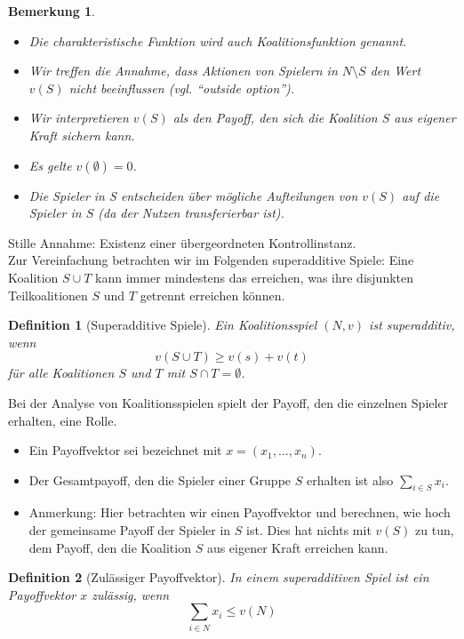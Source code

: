 \documentclass[12pt]{extreport} %
\theoremstyle{named}
\theoremstyle{itshape}
\newtheorem*{definition}{Definition}
\theoremstyle{normal}
\newtheorem*{bemerkung}{Bemerkung}
\begin{document}
\begin{bemerkung} ~\
  \begin{itemize}
	\item Die charakteristische Funktion wird auch Koalitionsfunktion genannt.
	\item Wir treffen die Annahme, dass Aktionen von Spielern in $N \setminus S$ den Wert $v(S)$ nicht beeinflussen (vgl. \enquote{outside option}).
	\item Wir interpretieren $v(S)$ als den Payoff, den sich die Koalition $S$ aus eigener Kraft sichern kann.
	\item Es gelte $v(\emptyset) = 0$.
	\item Die Spieler in S entscheiden über mögliche Aufteilungen von $v(S)$ auf die Spieler in $S$ (da der Nutzen transferierbar ist).	
  \end{itemize}	
\end{bemerkung}

Stille Annahme: Existenz einer übergeordneten Kontrollinstanz.~\\

Zur Vereinfachung betrachten wir im Folgenden superadditive Spiele: Eine Koalition $S \cup T$ kann immer mindestens das erreichen, was ihre disjunkten Teilkoalitionen $S$ und $T$ getrennt erreichen können.

\begin{definition}[Superadditive Spiele]
	Ein Koalitionsspiel $(N, v)$ ist superadditiv, wenn
	$$ v(S \cup T) \geq v(s) + v(t) $$
	für alle Koalitionen $S$ und $T$ mit $S \cap T = \emptyset$.
\end{definition}
	
Bei der Analyse von Koalitionsspielen spielt der Payoff, den die einzelnen Spieler erhalten, eine Rolle.
\begin{itemize}
	\item Ein Payoffvektor sei bezeichnet mit $x = (x_1, \dotsc, x_n)$.
	\item Der Gesamtpayoff, den die Spieler einer Gruppe $S$ erhalten ist also $\sum_{i \in S} x_i$.
	\item Anmerkung: Hier betrachten wir einen Payoffvektor und berechnen, wie hoch der gemeinsame Payoff der Spieler in $S$ ist. Dies hat nichts mit $v(S)$ zu tun, dem Payoff, den die Koalition $S$ aus eigener Kraft erreichen kann.
\end{itemize} 

\begin{definition}[Zulässiger Payoffvektor]
	In einem superadditiven Spiel ist ein Payoffvektor $x$ zulässig, wenn
	$$ \sum_{i \in N} x_i \leq v(N) $$
\end{definition} ~\\
	
\end{document}
